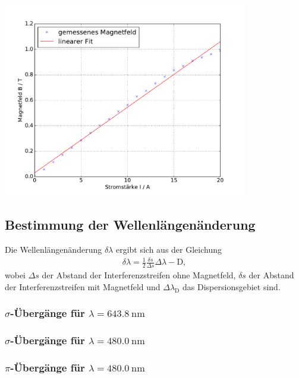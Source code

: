\documentclass[captions=tableheading]{scrartcl}
\begin{document}
\begin{center}
	\includegraphics[width=0.8\textwidth]{images/magnetfeld.pdf}
	\label{fig:magnetfeld}
\end{center}

\subsection{Bestimmung der Wellenlängenänderung}
Die Wellenlängenänderung $\delta\lambda$ ergibt sich aus der Gleichung
\begin{align}
\delta\lambda=\frac{1}{2}\frac{\delta s}{\Delta s}\Delta\lambda-{\text{D}},
\end{align}
wobei $\Delta s$ der Abstand der Interferenzstreifen ohne Magnetfeld, $\delta s$ der Abstand der Interferenzstreifen mit Magnetfeld und $\Delta\lambda_{\text{D}}$ das Dispersionsgebiet sind.

\subsubsection{$\sigma$-Übergänge für $\lambda=\SI{643.8}{\nano\metre}$}

\subsubsection{$\sigma$-Übergänge für $\lambda=\SI{480.0}{\nano\metre}$}

\subsubsection{$\pi$-Übergänge für $\lambda=\SI{480.0}{\nano\metre}$}
\end{document}
